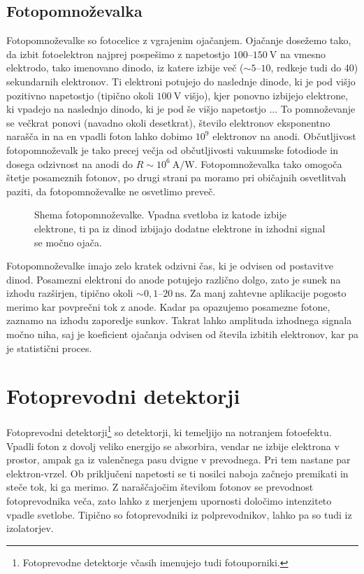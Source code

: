 \subsection*{Fotopomnoževalka}
Fotopomnoževalke so fotocelice z vgrajenim ojačanjem. Ojačanje dosežemo tako, da 
izbit fotoelektron najprej pospešimo z napetostjo $100$--$150~\si{\volt}$ na vmesno elektrodo, 
tako imenovano dinodo, iz katere izbije več ($\sim 5$--$10$, redkeje tudi do 40) 
sekundarnih elektronov. Ti elektroni
potujejo do naslednje dinode, ki je pod višjo pozitivno napetostjo (tipično okoli $100~\si{\volt}$
višjo), kjer ponovno izbijejo elektrone, ki vpadejo na naslednjo dinodo, ki je pod še višjo napetostjo ... 
To pomnoževanje se večkrat ponovi (navadno okoli desetkrat),
število elektronov eksponentno narašča in na en vpadli foton lahko dobimo $10^9$ elektronov na anodi. 
Občutljivost fotopomnoževalk je tako precej večja od občutljivosti vakuumske fotodiode in
dosega odzivnost na anodi do $R\sim 10^6~\si{\ampere/\watt}$.
Fotopomnoževalka tako omogoča štetje posameznih fotonov, po drugi strani pa moramo pri 
običajnih osvetlitvah paziti, da fotopomnoževalke ne osvetlimo preveč. 
\begin{figure}[h]
\centering
\def\svgwidth{80truemm} 

\caption{Shema fotopomnoževalke. Vpadna svetloba iz katode izbije elektrone, ti pa 
iz dinod izbijajo dodatne elektrone in izhodni signal se močno ojača.}
\label{fig:PMT}
\end{figure}

Fotopomnoževalke imajo zelo kratek odzivni čas, ki je odvisen od postavitve dinod. Posamezni 
elektroni do anode potujejo različno dolgo, zato je sunek na izhodu 
razširjen, tipično okoli $\sim 0,1$--$20~\si{\nano\second}$.  
Za manj zahtevne aplikacije pogosto merimo kar povprečni tok z anode. Kadar pa opazujemo
posamezne fotone, zaznamo na izhodu zaporedje sunkov. Takrat lahko 
amplituda izhodnega signala močno niha, saj je koeficient ojačanja 
odvisen od števila izbitih elektronov, kar pa je statistični proces. 

\section{Fotoprevodni detektorji}
Fotoprevodni detektorji\footnote{Fotoprevodne detektorje včasih imenujejo tudi fotouporniki.} 
so detektorji, ki temeljijo na notranjem fotoefektu.
Vpadli foton z dovolj veliko energijo se absorbira, vendar ne izbije elektrona v prostor, 
ampak ga iz valenčnega pasu dvigne v prevodnega. Pri tem nastane par elektron-vrzel. 
Ob priključeni napetosti se ti nosilci naboja začnejo premikati in steče tok, 
ki ga merimo. Z naraščajočim številom fotonov se prevodnost fotoprevodnika veča, 
zato lahko z merjenjem upornosti določimo 
intenziteto vpadle svetlobe. Tipično so fotoprevodniki iz polprevodnikov, 
lahko pa so tudi iz izolatorjev. 

